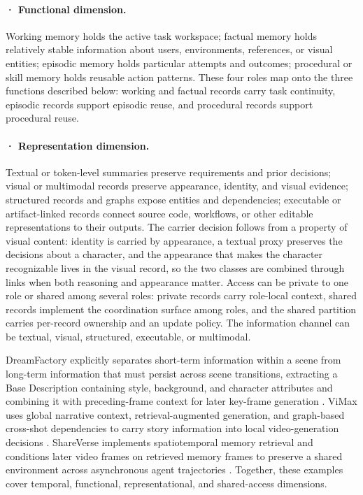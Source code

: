 \paragraph{· Functional dimension.} Working memory holds the active task workspace; factual memory holds relatively stable information about users, environments, references, or visual entities; episodic memory holds particular attempts and outcomes; procedural or skill memory holds reusable action patterns. These four roles map onto the three functions described below: working and factual records carry task continuity, episodic records support episodic reuse, and procedural records support procedural reuse.

\paragraph{· Representation dimension.} Textual or token-level summaries preserve requirements and prior decisions; visual or multimodal records preserve appearance, identity, and visual evidence; structured records and graphs expose entities and dependencies; executable or artifact-linked records connect source code, workflows, or other editable representations to their outputs. The carrier decision follows from a property of visual content: identity is carried by appearance, a textual proxy preserves the decisions about a character, and the appearance that makes the character recognizable lives in the visual record, so the two classes are combined through links when both reasoning and appearance matter. Access can be private to one role or shared among several roles: private records carry role-local context, shared records implement the coordination surface among roles, and the shared partition carries per-record ownership and an update policy. The information channel can be textual, visual, structured, executable, or multimodal.

DreamFactory explicitly separates short-term information within a scene from long-term information that must persist across scene transitions, extracting a Base Description containing style, background, and character attributes and combining it with preceding-frame context for later key-frame generation \cite{xie2024dreamfactory}. ViMax uses global narrative context, retrieval-augmented generation, and graph-based cross-shot dependencies to carry story information into local video-generation decisions \cite{huang2026vimax}. ShareVerse implements spatiotemporal memory retrieval and conditions later video frames on retrieved memory frames to preserve a shared environment across asynchronous agent trajectories \cite{avg260302697}. Together, these examples cover temporal, functional, representational, and shared-access dimensions.

